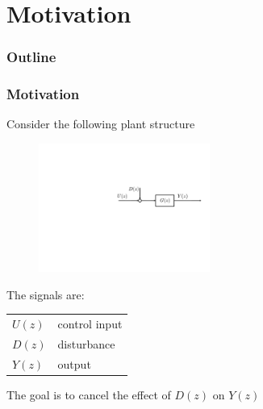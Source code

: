 \section{Motivation}
\begin{frame}
    \frametitle{Outline}
    \tableofcontents[currentsection]
\end{frame}

\begin{frame}
    \frametitle{Motivation}

    Consider the following plant structure
    \begin{figure}
        \includegraphics[width=0.5\textwidth]{Disturbance_Observer_motiv1}\\
    \end{figure}

    The signals are:

    \begin{center}
    \begin{tabular}{l @{ : } l}
        $U(z)$ & control input \\
        $D(z)$ & disturbance \\
        $Y(z)$ & output
    \end{tabular}
    \end{center}
    \pause

    The goal is to cancel the effect of $D(z)$ on $Y(z)$
\end{frame}

